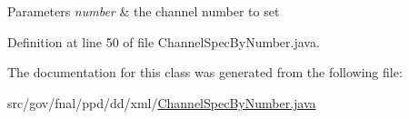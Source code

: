 \begin{DoxyParams}{Parameters}
{\em number} & the channel number to set \\
\hline
\end{DoxyParams}


Definition at line 50 of file Channel\-Spec\-By\-Number.\-java.



The documentation for this class was generated from the following file\-:\begin{DoxyCompactItemize}
\item 
src/gov/fnal/ppd/dd/xml/\hyperlink{ChannelSpecByNumber_8java}{Channel\-Spec\-By\-Number.\-java}\end{DoxyCompactItemize}
